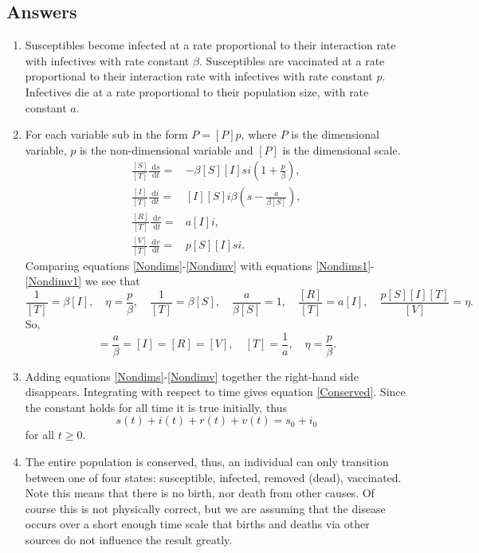 \documentclass[10pt]{article}
\newcommand{\bb}{\begin{equation}}
\newcommand{\ee}{\end{equation}}
\newcommand{\rd}{\text{ d}}
\newcommand{\eqn}[1]{equation \eqref{#1}}
\newcommand{\eqnto}[2]{equations \eqref{#1}-\eqref{#2}}
\renewcommand{\l}{\left(}
\renewcommand{\r}{\right)}
\begin{document}
\begin{Answ}
\subsection{Answers}
\begin{enumerate}
\item Susceptibles become infected at a rate proportional to their interaction rate with infectives with rate constant $\beta$. Susceptibles are vaccinated at a rate proportional to their interaction rate with infectives with rate constant $p$. Infectives die at a rate proportional to their population size, with rate constant $a$.



\item For each variable sub in the form $P=[P]p$, where $P$ is the dimensional variable, $p$ is the non-dimensional variable and $[P]$ is the dimensional scale.
\begin{align}
\frac{[S]}{[T]}\frac{\rd s}{\rd t} =&-\beta [S][I]si\l 1+\frac{p}{\beta}\r,\label{Nondims}\\
\frac{[I]}{[T]}\frac{\rd i}{\rd t} =&[I][S]i\beta\l s-\frac{a}{\beta[S]}\r,\\
\frac{[R]}{[T]}\frac{\rd r}{\rd t} =&a[I]i,\\
\frac{[V]}{[T]}\frac{\rd v}{\rd t} =&p[S][I]si.\label{Nondimv}
\end{align}
Comparing \eqnto{Nondims}{Nondimv} with \eqnto{Nondims1}{Nondimv1} we see that
\bb
\frac{1}{[T]}=\beta[I],\quad \eta=\frac{p}{\beta},\quad \frac{1}{[T]}=\beta[S],\quad \frac{a}{\beta[S]}=1,\quad\frac{[R]}{[T]}=a[I],\quad \frac{p[S][I][T]}{[V]}=\eta.
\ee
So,
\bb
[S]=\frac{a}{\beta}=[I]=[R]=[V], \quad [T]=\frac{1}{a},\quad \eta=\frac{p}{\beta}.
\ee
\item Adding \eqnto{Nondims}{Nondimv} together the right-hand side disappears. Integrating with respect to time gives \eqn{Conserved}. Since the constant holds for all time it is true initially, thus
\bb
s(t)+i(t)+r(t)+v(t)=s_0+i_0
\ee
for all $t\geq 0$.

\item The entire population is conserved, thus, an individual can only transition between one of four states: susceptible, infected, removed (dead), vaccinated. Note this means that there is no birth, nor death from other causes. Of course this is not physically correct, but we are assuming that the disease occurs over a short enough time scale that births and deaths via other sources do not influence the result greatly.


\end{enumerate}
\end{Answ}
\end{document}
